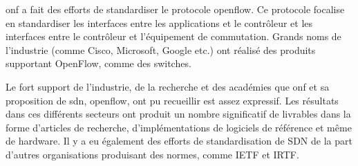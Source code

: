 \gls{onf} a fait des efforts de standardiser le protocole \gls{openflow}. Ce protocole focalise en standardiser les interfaces entre les applications et le contrôleur et les interfaces entre le contrôleur et l'équipement de commutation. Grands noms de l'industrie (comme Cisco, Microsoft, Google etc.) ont réalisé des produits supportant OpenFlow, comme des switches. \cite{SurveySDNArchi}

Le fort support de l'industrie, de la recherche et des académies que \gls{onf} et sa proposition de \gls{sdn}, \gls{openflow}, ont pu recueillir est assez expressif. Les résultats dans ces différents secteurs ont produit un nombre significatif de livrables dans la forme d'articles de recherche, d'implémentations de logiciels de référence et même de hardware. Il y a eu également des efforts de standardisation de SDN de la part d'autres organisations produisant des normes, comme IETF et IRTF. \cite{SurveySDNIntro}



